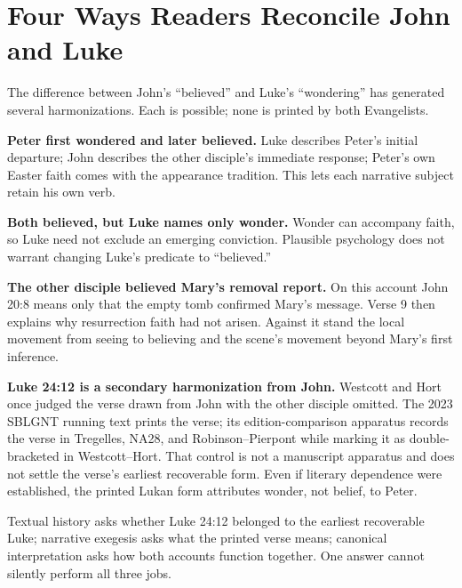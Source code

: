 \section{Four Ways Readers Reconcile John and Luke}

The difference between John's ``believed'' and Luke's ``wondering'' has
generated several harmonizations. Each is possible; none is printed by both
Evangelists.

\textbf{Peter first wondered and later believed.} Luke describes Peter's
initial departure; John describes the other disciple's immediate response;
Peter's own Easter faith comes with the appearance tradition. This lets each
narrative subject retain his own verb.

\textbf{Both believed, but Luke names only wonder.} Wonder can accompany faith,
so Luke need not exclude an emerging conviction. Plausible psychology does not
warrant changing Luke's predicate to ``believed.''

\textbf{The other disciple believed Mary's removal report.} On this account
John 20:8 means only that the empty tomb confirmed Mary's message. Verse 9 then
explains why resurrection faith had not arisen. Against it stand the local
movement from seeing to believing and the scene's movement beyond Mary's first
inference.

\textbf{Luke 24:12 is a secondary harmonization from John.} Westcott and Hort
once judged the verse drawn from John with the other disciple omitted. The
2023 SBLGNT running text prints the verse; its edition-comparison apparatus
records the verse in Tregelles, NA28, and Robinson--Pierpont while marking it
as double-bracketed in Westcott--Hort. That control is not a manuscript
apparatus and does not settle the verse's earliest recoverable form. Even if
literary dependence were established, the printed Lukan form attributes
wonder, not belief, to Peter.

Textual history asks whether Luke 24:12 belonged to the earliest recoverable
Luke; narrative exegesis asks what the printed verse means; canonical
interpretation asks how both accounts function together. One answer cannot
silently perform all three jobs.

